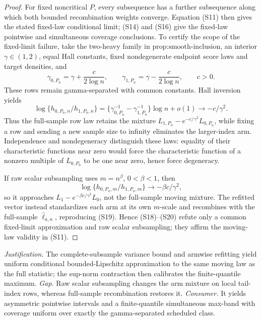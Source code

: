 \documentclass{article}
\begin{document}
\begin{proof}
For fixed noncritical \(P\), every subsequence has a further subsequence along which both bounded recombination weights converge. Equation (S11) then gives the stated fixed-law conditional limit; (S14) and (S16) give the fixed-law pointwise and simultaneous coverage conclusions. To certify the scope of the fixed-limit failure, take the two-heavy family in \(\text{prop:smooth-inclusion}\), an interior \(\gamma\in(1,2)\), equal Hall constants, fixed nondegenerate endpoint score laws and target densities, and
\[
\gamma_{0,P_n}=\gamma+\frac c{2\log n},
\qquad
\gamma_{1,P_n}=\gamma-\frac c{2\log n},
\qquad c>0.
\tag{S18}
\]
These rows remain gamma-separated with common constants. Hall inversion yields
\[
\log\{h_{0,P_n,n}/h_{1,P_n,n}\}
=\{\gamma_{0,P_n}^{-1}-\gamma_{1,P_n}^{-1}\}\log n+o(1)
\longrightarrow-c/\gamma^2.
\tag{S19}
\]
Thus the full-sample row law retains the mixture
\(L_{1,P_n}-e^{-c/\gamma^2}L_{0,P_n}\), while fixing a row and sending a new sample size to infinity eliminates the larger-index arm. Independence and nondegeneracy distinguish these laws: equality of their characteristic functions near zero would force the characteristic function of a nonzero multiple of \(L_{0,P_n}\) to be one near zero, hence force degeneracy.

If raw scalar subsampling uses \(m=n^\beta\), \(0<\beta<1\), then
\[
\log\{h_{0,P_n,m}/h_{1,P_n,m}\}\longrightarrow-\beta c/\gamma^2,
\tag{S20}
\]
so it approaches \(L_1-e^{-\beta c/\gamma^2}L_0\), not the full-sample moving mixture. The refitted vector instead standardizes each arm at its own \(m\)-scale and recombines with the full-sample \(\widehat\ell_{a,n}\), reproducing (S19). Hence (S18)--(S20) refute only a common fixed-limit approximation and raw scalar subsampling; they affirm the moving-law validity in (S11).
\end{proof}
\par\smallskip\noindent \textit{Justification.} The complete-subsample variance bound and armwise refitting yield uniform conditional bounded-Lipschitz approximation to the same moving law as the full statistic; the sup-norm contraction then calibrates the finite-quantile maximum. \textit{Gap.} Raw scalar subsampling changes the arm mixture on local tail-index rows, whereas full-sample recombination restores it. \textit{Consumer.} It yields asymmetric pointwise intervals and a finite-quantile simultaneous max-band with coverage uniform over exactly the gamma-separated scheduled class.
\end{document}
